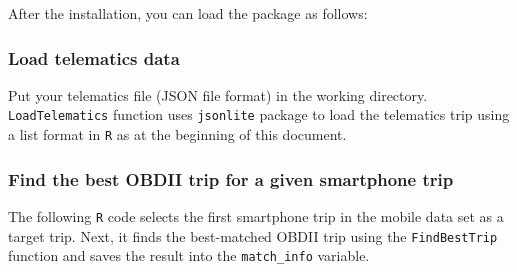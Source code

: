 \documentclass[letterpaper,9pt,twocolumn,twoside,]{pinp}
\begin{document}
After the installation, you can load the package as follows:

\begin{Shaded}
\begin{Highlighting}[]
\end{Highlighting}
\end{Shaded}

\hypertarget{load-telematics-data}{%
\subsubsection{Load telematics data}\label{load-telematics-data}}

Put your telematics file (JSON file format) in the working directory.
\texttt{LoadTelematics} function uses \texttt{jsonlite} package to load
the telematics trip using a list format in \texttt{R} as at the
beginning of this document.

\begin{Shaded}
\begin{Highlighting}[]
\StringTok{ }\NormalTok{(}\NormalTok{)}
\StringTok{ }\NormalTok{(}\NormalTok{)}
\end{Highlighting}
\end{Shaded}

\hypertarget{find-the-best-obdii-trip-for-a-given-smartphone-trip}{%
\subsubsection{Find the best OBDII trip for a given smartphone
trip}\label{find-the-best-obdii-trip-for-a-given-smartphone-trip}}

The following \texttt{R} code selects the first smartphone trip in the
mobile data set as a target trip. Next, it finds the best-matched OBDII
trip using the \texttt{FindBestTrip} function and saves the result into
the \texttt{match\_info} variable.

\begin{Shaded}
\begin{Highlighting}[]
\StringTok{ }\NormalTok{mobile_data[[}\NormalTok{]]}

\StringTok{ }
                            \NormalTok{)}
\end{Highlighting}
\end{Shaded}
\end{document}
